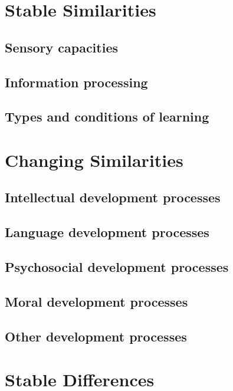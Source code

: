 \documentclass[12pt]{report} %
\begin{document}

\section{Stable Similarities}

\subsection{Sensory capacities}

\subsection{Information processing}

\subsection{Types and conditions of learning}


\section{Changing Similarities}

\subsection{Intellectual development processes}

\subsection{Language development processes}

\subsection{Psychosocial development processes}

\subsection{Moral development processes}

\subsection{Other development processes}


\section{Stable Differences}
\end{document}
